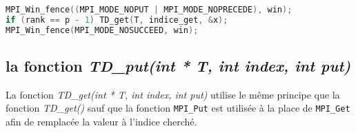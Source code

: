 \begin{lstlisting}[language=c, style=b&w, title={Utilisation de \textit{MPI\_Win\_fence} pour l'utilisation de RMA}]
MPI_Win_fence((MPI_MODE_NOPUT | MPI_MODE_NOPRECEDE), win);
if (rank == p - 1) TD_get(T, indice_get, &x);
MPI_Win_fence(MPI_MODE_NOSUCCEED, win);
\end{lstlisting}

\subsection*{la fonction \textit{TD\_put(int * T, int index, int put)}}
La fonction \textit{TD\_get(int * T, int index, int put)} utilise le même principe que la fonction \textit{TD\_get()} sauf que la fonction \verb+MPI_Put+ est utilisée à la place de \verb+MPI_Get+ afin de remplacée la valeur à l'indice cherché.